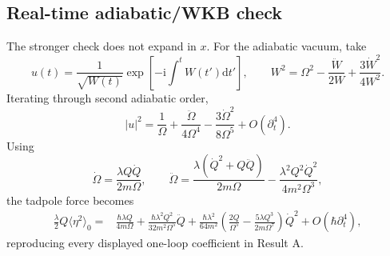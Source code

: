\documentclass[9pt]{extarticle}
\newcommand{\dd}{\mathrm d}
\newcommand{\ii}{\mathrm i}
\newcommand{\Om}{\Omega}
\begin{document}
\subsection{Real-time adiabatic/WKB check}

The stronger check does not expand in $x$.  For the adiabatic vacuum, take
\begin{equation}
u(t)=\frac1{\sqrt{W(t)}}\exp\left[-\ii\int^tW(t')\dd t'\right],
\qquad
W^2=\Om^2-\frac{\ddot W}{2W}+\frac{3\dot W^2}{4W^2}.
\label{eq:WKB}
\end{equation}
Iterating through second adiabatic order,
\begin{equation}
|u|^2=\frac1\Om+\frac{\ddot\Om}{4\Om^4}-\frac{3\dot\Om^2}{8\Om^5}+O(\partial_t^4).
\label{eq:uWKB}
\end{equation}
Using
\begin{equation}
\dot\Om=\frac{\lambda Q\dot Q}{2m\Om},
\qquad
\ddot\Om=\frac{\lambda(\dot Q^2+Q\ddot Q)}{2m\Om}
-\frac{\lambda^2Q^2\dot Q^2}{4m^2\Om^3},
\label{eq:Omdots}
\end{equation}
the tadpole force becomes
\begin{align}
\frac\lambda2Q\langle\eta^2\rangle_0
={}&\frac{\hbar\lambda Q}{4m\Om}
+\frac{\hbar\lambda^2Q^2}{32m^2\Om^5}\ddot Q
+\frac{\hbar\lambda^2}{64m^2}
\left(\frac{2Q}{\Om^5}-\frac{5\lambda Q^3}{2m\Om^7}\right)\dot Q^2
+O(\hbar\partial_t^4),
\label{eq:WKBmatch}
\end{align}
reproducing every displayed one-loop coefficient in Result A.

\vspace{2pt}
\end{document}
